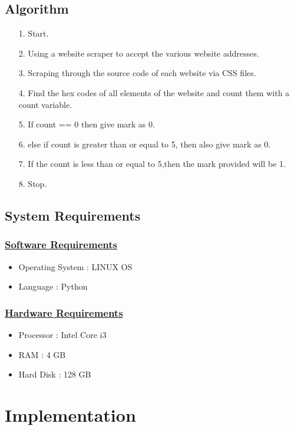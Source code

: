 \documentclass{fisatproject}
\begin{document}
\subsection{Algorithm}
\begin{itemize}
	\item[1.] Start.
	\item[2.] Using a website scraper to accept the various website
	addresses.
	\item[3.] Scraping through the source code of each website via CSS files.
	\item[4.] Find the hex codes of all elements of the website and count them with a count variable.
	\item[5.] If count == 0 then give mark as 0.
	\item[6.] else if count is greater than or equal to 5, then also give mark as 0.
	\item[7.]If the count is less than or equal to 5,then the mark provided will be 1.
	\item[8.]Stop.
\end{itemize}
\subsection{System Requirements}
\subsubsection{\underline{Software Requirements}}
\begin{itemize}
	\item Operating System : LINUX OS 
	
	\item Language : Python
\end{itemize}

\subsubsection{\underline{Hardware Requirements}}
\begin{itemize}
	\item Processor : Intel Core i3 
	\item RAM : 4 GB
	\item Hard Disk : 128 GB
	
\end{itemize}


\section{Implementation}
\end{document}
